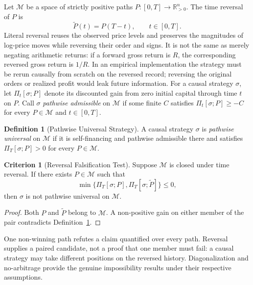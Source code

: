 \documentclass[aps,pra,reprint,superscriptaddress,amsmath,amssymb,floatfix]{revtex4-2}
\theoremstyle{plain}
\theoremstyle{definition}
\newtheorem{definition}{Definition}
\newtheorem{criterion}{Criterion}
\theoremstyle{remark}
\begin{document}
Let \(\mathcal{M}\) be a space of strictly positive paths
\(P\colon[0,T]\to\mathbb{R}_{>0}^n\). The time reversal of \(P\) is
\begin{equation}
  \widetilde{P}(t)=P(T-t), \qquad t\in[0,T].
  \label{eq:timereversal}
\end{equation}
Literal reversal reuses the observed price levels and preserves the magnitudes
of log-price moves while reversing their order and signs. It is not the same
as merely negating arithmetic returns: if a forward gross return is \(R\), the
corresponding reversed gross return is \(1/R\). In an empirical implementation
the strategy must be rerun causally from scratch on the reversed record;
reversing the original orders or realized profit would leak future information.
For a causal strategy \(\sigma\), let \(\Pi_t[\sigma;P]\) denote its discounted
gain from zero initial capital through time \(t\) on \(P\). Call \(\sigma\)
\emph{pathwise admissible} on \(\mathcal M\) if some finite \(C\) satisfies
\(\Pi_t[\sigma;P]\geq-C\) for every \(P\in\mathcal M\) and
\(t\in[0,T]\).

\begin{definition}[Pathwise Universal Strategy]
\label{def:universal}
  A causal strategy \(\sigma\) is \emph{pathwise universal} on
  \(\mathcal{M}\) if it is self-financing and pathwise admissible there and
  satisfies \(\Pi_T[\sigma;P]>0\) for every \(P\in\mathcal{M}\).
\end{definition}

\begin{criterion}[Reversal Falsification Test]
  \label{crit:tr}
  Suppose \(\mathcal{M}\) is closed under time reversal. If there exists
  \(P\in\mathcal{M}\) such that
  \begin{equation}
    \min\{\Pi_T[\sigma;P],\Pi_T[\sigma;\widetilde P]\}\leq 0,
    \label{eq:reversaltest}
  \end{equation}
  then \(\sigma\) is not pathwise universal on \(\mathcal{M}\).
\end{criterion}

\begin{proof}
Both \(P\) and \(\widetilde P\) belong to \(\mathcal{M}\). A non-positive gain
on either member of the pair contradicts Definition~\ref{def:universal}.
\end{proof}

One non-winning path refutes a claim quantified over every path. Reversal
supplies a paired candidate, not a proof that one member must fail: a causal
strategy may take different positions on the reversed history.
Diagonalization and no-arbitrage provide the genuine impossibility results
under their respective assumptions.
\end{document}
